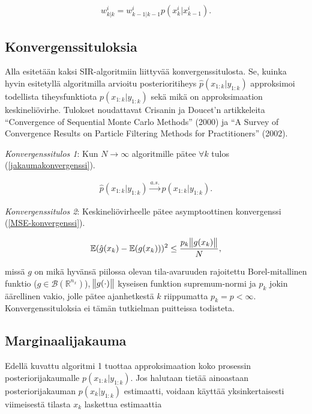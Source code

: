 \documentclass[
  12pt,
  a4paper, twoside]{book}
\begin{document}
\begin{align}\label{uskottavuusotanta-w}
w^i_{k|k} = w^i_{k-1|k-1}p(x^i_k|x^i_{k-1}).
\end{align}

\subsection{Konvergenssituloksia}

Alla esitetään kaksi SIR-algoritmiin liittyvää konvergenssitulosta. Se, kuinka hyvin esitetyllä algoritmilla arvioitu posterioritiheys \(\hat{p}(x_{1:k}|y_{1:k})\) approksimoi todellista tiheysfunktiota \(p(x_{1:k}|y_{1:k})\) sekä mikä on approksimaation keskineliövirhe. Tulokset noudattavat Crisanin ja Doucet'n artikkeleita ``Convergence of Sequential Monte Carlo Methods'' (2000) ja ``A Survey of Convergence Results on Particle Filtering Methods for Practitioners'' (2002).

\textit{Konvergenssitulos 1}: Kun \(N \rightarrow \infty\) algoritmille pätee \(\forall k\) tulos (\ref{jakaumakonvergenssi}).

\begin{align}\label{jakaumakonvergenssi}
\hat{p}(x_{1:k}|y_{1:k}) \xrightarrow{a.s.} p(x_{1:k}|y_{1:k}).
\end{align}

\textit{Konvergenssitulos 2}: Keskineliövirheelle pätee asymptoottinen konvergenssi (\ref{MSE-konvergenssi}).

\begin{align}\label{MSE-konvergenssi}
\mathbb{E}(\hat{g}(x_k)-\mathbb{E}(g(x_k)))^2\leq\frac{p_k\norm{g(x_k)}}{N},
\end{align}

\noindent missä \(g\) on mikä hyvänsä piilossa olevan tila-avaruuden rajoitettu Borel-mitallinen funktio (\(g \in \mathcal{B}(\mathbb{R}^{n_x})\)), \(\norm{g(\cdot)}\) kyseisen funktion supremum-normi ja \(p_k\) jokin äärellinen vakio, jolle pätee ajanhetkestä \(k\) riippumatta \(p_k=p<\infty\). Konvergenssituloksia ei tämän tutkielman puitteissa todisteta.

\subsection{Marginaalijakauma}

Edellä kuvattu algoritmi 1 tuottaa approksimaation koko prosessin posteriorijakaumalle \(p(x_{1:k}|y_{1:k})\). Jos halutaan tietää ainoastaan posteriorijakauman \(p(x_k|y_{1:k})\) estimaatti, voidaan käyttää yksinkertaisesti viimeisestä tilasta \(x_k\) laskettua estimaattia
\end{document}
